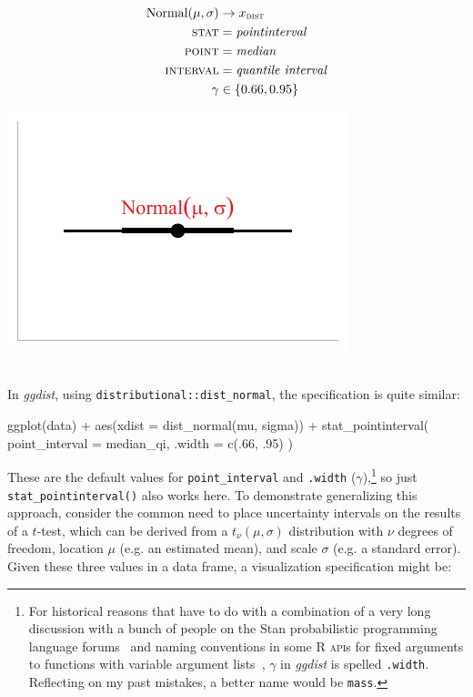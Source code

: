 \documentclass[journal]{vgtc}                     %
\newenvironment{centerverbatim}{%
\setlength{\parskip}{.4\belowdisplayskip}%
\vspace{.55\abovedisplayskip}%
\noindent%
\small%
\centering%
\varwidth{\linewidth}%
\verbatim
}{%
\endverbatim%
\endvarwidth%
\par%
\hfill\break%
}
\newcommand{\equationfigure}[2]{%
\noindent
\begin{minipage}{.5\columnwidth}
\setlength{\abovedisplayskip}{0pt}
\setlength{\belowdisplayskip}{0pt}
#1\end{minipage}%
\begin{minipage}{.4\columnwidth}\centering #2 \end{minipage}%
\vspace{.5\belowdisplayskip}\\
}
\begin{document}
\equationfigure{
\begin{align*}
  \operatorname{Normal}(\mu, \sigma) &\rightarrow x_\textsc{dist}\\
  \textsc{stat} &= \mathit{pointinterval}\\
  \textsc{point} &= \mathit{median}\\
  \textsc{interval} &= \textit{quantile interval}\\
  \gamma &\in \{0.66, 0.95\}
\end{align*}
}{\includegraphics[width=1.2\columnwidth]{figs/3-stat_pointinterval_normal.pdf}}
In \textit{ggdist}, using \texttt{distributional::dist\_normal}, the specification is quite similar:

\begin{centerverbatim}
ggplot(data) +
  aes(xdist = dist_normal(mu, sigma)) +
  stat_pointinterval(
    point_interval = median_qi, 
    .width = c(.66, .95)
  )
\end{centerverbatim}
These are the default values for \texttt{point\_interval} and \texttt{.width} ($\gamma$),\footnote{For historical reasons that have to do with a combination of a very long discussion with a bunch of people on the Stan probabilistic programming language forums~\cite{kay2018stannames} and naming conventions in some R \textsc{api}s for fixed arguments to functions with variable argument lists~\cite{tidyverse2020dotprefix}, $\gamma$ in \textit{ggdist} is spelled \texttt{.width}. Reflecting on my past mistakes, a better name would be  \texttt{mass}.} so just \texttt{stat\_pointinterval()}  also works here. To demonstrate generalizing this approach, consider the common need to place uncertainty intervals on the results of a $t$-test, which can be derived from a $t_\nu(\mu, \sigma)$  distribution with $\nu$ degrees of freedom, location $\mu$ (e.g. an estimated mean), and scale $\sigma$ (e.g. a standard error). Given these three values in a data frame, a visualization specification might be:
\end{document}
